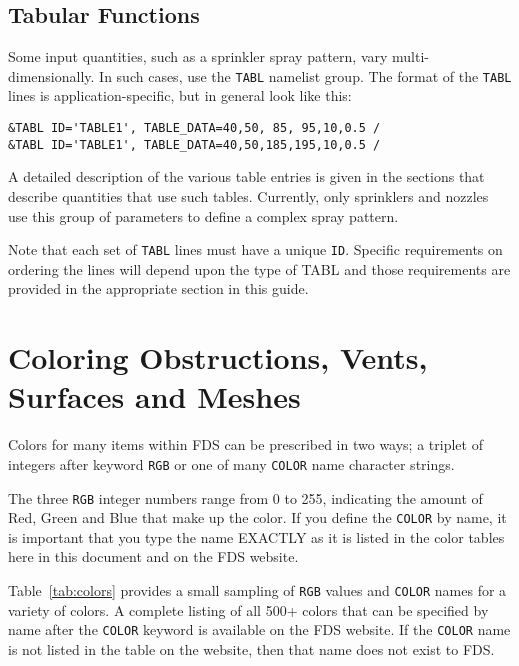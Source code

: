 \documentclass[11pt]{book}
\newcommand{\ct}{\tt\small}
\begin{document}
\subsection{Tabular Functions}

Some input quantities, such as a sprinkler spray pattern, vary multi-dimensionally. In such cases, use
the {\ct TABL} namelist group. The format of the {\ct TABL} lines is application-specific, but in general look like this:

\footnotesize
\begin{verbatim}
&TABL ID='TABLE1', TABLE_DATA=40,50, 85, 95,10,0.5 /
&TABL ID='TABLE1', TABLE_DATA=40,50,185,195,10,0.5 /
\end{verbatim}
\normalsize

\noindent
A detailed description of the various table entries is given in the sections that describe quantities that use such
tables. Currently, only sprinklers and nozzles use this group of parameters to define a complex spray pattern.

\begin{warning}
\noindent
Note that each set of {\ct TABL} lines must have a unique {\ct ID}.  Specific requirements on ordering the lines
will depend upon the type of TABL and those requirements are provided in the appropriate section in this guide.
\end{warning}


\clearpage

\section{Coloring Obstructions, Vents, Surfaces and Meshes}
\label{info:colors}

Colors for many items within FDS can be prescribed in two ways; a triplet of
integers after keyword {\ct RGB} or one of many {\ct COLOR} name character strings.

The three {\ct RGB} integer numbers range from 0 to 255, indicating the amount of Red, Green and Blue
that make up the color. If you define the {\ct COLOR} by name, it is important that you type the name EXACTLY as it
is listed in the color tables here in this document and on the FDS website.

Table~\ref{tab:colors} provides a small sampling of {\ct RGB} values and {\ct COLOR} names
for a variety of colors. A complete listing of all 500+ colors that can be
specified by name after the {\ct COLOR} keyword is available on the FDS website.
If the {\ct COLOR} name is not listed in the table on the website, then that name does not exist to FDS.
\end{document}
